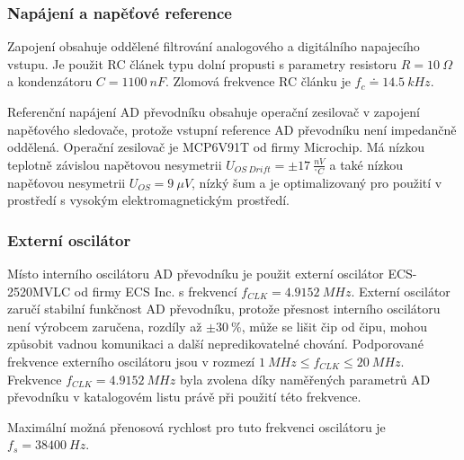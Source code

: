 \subsubsection{Napájení a napěťové reference}
Zapojení obsahuje oddělené filtrování analogového a digitálního napajecího vstupu. Je použit RC článek typu dolní propusti s parametry resistoru $R = 10 \ \Omega$ a kondenzátoru $C = 1100 \ nF$. Zlomová frekvence RC článku je $f_c \doteq 14.5 \ kHz$.
\par
Referenční napájení AD převodníku obsahuje operační zesilovač v zapojení napěťového sledovače, protože vstupní reference AD převodníku není impedančně oddělená. Operační zesilovač je MCP6V91T od firmy Microchip. Má nízkou teplotně závislou napětovou nesymetrii $U_{OS \ Drift} = \pm 17  \ \frac{nV}{^\circ C}$
a také nízkou napěťovou nesymetrii $U_{OS} = 9 \ \mu V$, nízký šum a je optimalizovaný pro použití v prostředí s vysokým elektromagnetickým prostředí.

\subsubsection{Externí oscilátor}
Místo interního oscilátoru AD převodníku je použit externí oscilátor ECS-2520MVLC od firmy ECS Inc. s frekvencí $f_{CLK} = 4.9152 \ MHz$. Externí oscilátor zaručí stabilní funkčnost AD převodníku, protože přesnost interního oscilátoru není výrobcem zaručena, rozdíly až $\pm 30  \ \%$, může se lišit čip od čipu, mohou způsobit vadnou komunikaci a další nepredikovatelné chování.
Podporované frekvence externího oscilátoru jsou v rozmezí $ 1 \ MHz \leq  f_{CLK} \leq 20 \ MHz $. Frekvence $f_{CLK} = 4.9152 \ MHz$ byla zvolena díky naměřených parametrů AD převodníku v katalogovém listu právě při použití této frekvence.
\par
Maximální možná přenosová rychlost pro tuto frekvenci oscilátoru je $f_s = 38400 \ Hz$.

